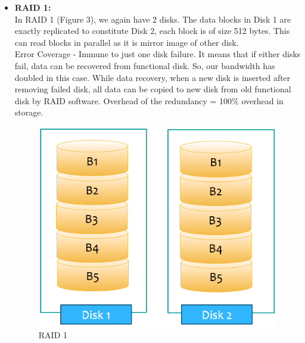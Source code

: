 \documentclass[12pt]{article}
\begin{document}
\begin{itemize}
    \item \textbf{RAID 1:} \\
    In RAID 1 (Figure 3), we again have 2 disks. The data blocks in Disk 1 are exactly replicated to constitute Disk 2, each block is of size 512 bytes. This can read blocks in parallel as it is mirror image of other disk. \\
    Error Coverage - Immune to just one disk failure. It means that if either disks fail, data can be recovered from functional disk. So, our bandwidth has doubled in this case. While data recovery, when a new disk is inserted after removing failed disk, all data can be copied to new disk from old functional disk by RAID software. 
    Overhead of the redundancy = 100\% overhead in storage.
    \begin{figure}
        \centering
        \includegraphics{Assignment-14/Raid_1.png}
        \caption{RAID 1}
    \end{figure}
    

\end{itemize}
\end{document}
